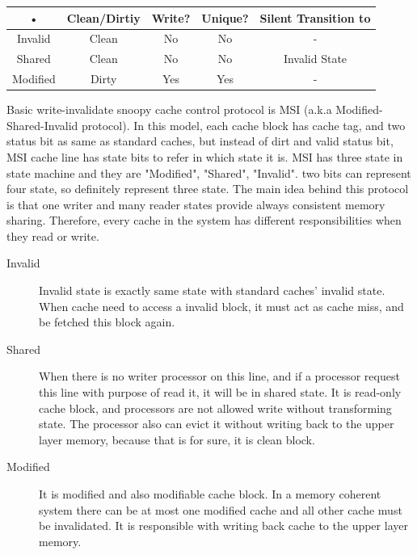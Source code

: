 \documentclass[informationsecurity]{gucmasterproject}
\begin{document}
\begin{tabular}{|c|c|c|c|c|}
\hline 
• & Clean/Dirtiy & Write? & Unique? & Silent Transition to \\ 
\hline 
Invalid & Clean & No & No & - \\ 
\hline 
Shared & Clean & No & No & Invalid State \\ 
\hline 
Modified & Dirty & Yes & Yes & - \\ 
\hline 
\end{tabular} 


Basic write-invalidate snoopy cache control protocol is MSI (a.k.a Modified-Shared-Invalid protocol). In this model, each cache block has cache tag, and two status bit as same as standard caches, but instead of dirt and valid status bit, MSI cache line has state bits to refer in which state it is. MSI has three state in state machine and they are "Modified", "Shared", "Invalid". two bits can represent four state, so definitely represent three state. The main idea behind this protocol is that one writer and many reader states provide always consistent memory sharing. Therefore, every cache in the system has different responsibilities when they read or write.

\begin{description}
\item[Invalid] Invalid state is exactly same state with standard caches' invalid state. When cache need to access a invalid block, it must act as cache miss, and  be fetched this block again.
\item[Shared] When there is no writer processor on this line, and if  a processor request this line with purpose of read it, it will be in shared state.  It is read-only cache block, and processors are not allowed write without transforming state. The processor also can evict it without writing back to the upper layer memory, because that is for sure, it is clean block.
\item[Modified] It is modified and also modifiable cache block. In a memory coherent system there can be at most one modified cache and all other cache must be invalidated. It is responsible with writing back cache to the upper layer memory. 
\end{description}
\end{document}
